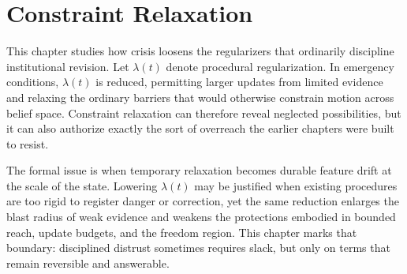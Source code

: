 
\chapter{Constraint Relaxation}
\label{ch:ch081}

This chapter studies how crisis loosens the regularizers that ordinarily discipline institutional revision. Let \(\lambda(t)\) denote procedural regularization. In emergency conditions, \(\lambda(t)\) is reduced, permitting larger updates from limited evidence and relaxing the ordinary barriers that would otherwise constrain motion across belief space. Constraint relaxation can therefore reveal neglected possibilities, but it can also authorize exactly the sort of overreach the earlier chapters were built to resist.

The formal issue is when temporary relaxation becomes durable feature drift at the scale of the state. Lowering \(\lambda(t)\) may be justified when existing procedures are too rigid to register danger or correction, yet the same reduction enlarges the blast radius of weak evidence and weakens the protections embodied in bounded reach, update budgets, and the freedom region. This chapter marks that boundary: disciplined distrust sometimes requires slack, but only on terms that remain reversible and answerable.
